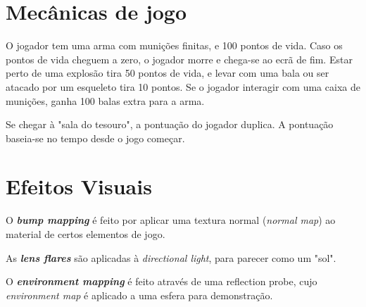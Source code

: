 \documentclass{article}
\begin{document}
    \section*{Mecânicas de jogo}
        \par
        O jogador tem uma arma com munições finitas, e 100 pontos de vida. Caso os pontos de vida cheguem a zero, o jogador morre e chega-se ao ecrã de fim. Estar perto de uma explosão tira 50 pontos de vida, e levar com uma bala ou ser atacado por um esqueleto tira 10 pontos. Se o jogador interagir com uma caixa de munições, ganha 100 balas extra para a arma.
        \par
        Se chegar à "sala do tesouro", a pontuação do jogador duplica. A pontuação baseia-se no tempo desde o jogo começar.
    \section*{Efeitos Visuais}
        \par
        O  \textbf{\textit{bump mapping}} é feito por aplicar uma textura normal (\textit{normal map}) ao material de certos elementos de jogo.
        \par
        As \textbf{\textit{lens flares}} são aplicadas à \textit{directional light}, para parecer como um "sol".
        \par
        O \textbf{\textit{environment mapping}} é feito através de uma reflection probe, cujo \textit{environment map} é aplicado a uma esfera para demonstração.
\end{document}
